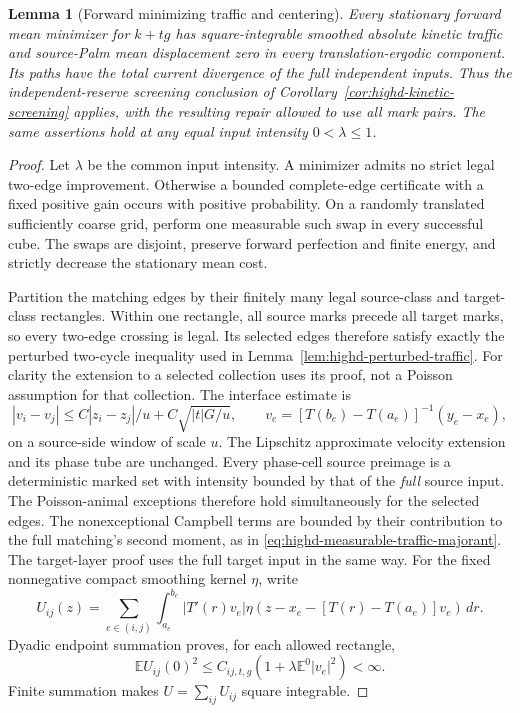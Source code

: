 \documentclass[11pt,reqno]{amsart}
\newtheorem{lemma}[theorem]{Lemma}
\theoremstyle{definition}
\theoremstyle{remark}
\numberwithin{equation}{section}
\newcommand{\E}{\mathbb E}
\begin{document}
\begin{lemma}[Forward minimizing traffic and centering]
\label{forward-full-traffic-centering}
Every stationary forward mean minimizer for \(k+t g\) has
square-integrable smoothed absolute kinetic traffic and source-Palm mean
displacement zero in every translation-ergodic component. Its paths have
the total current divergence of the full independent inputs. Thus the
independent-reserve screening conclusion of
Corollary~\ref{cor:highd-kinetic-screening} applies, with the resulting
repair allowed to use all mark pairs. The same assertions hold at any
equal input intensity \(0<\lambda\le1\).
\end{lemma}
\begin{proof}
Let \(\lambda\) be the common input intensity. A minimizer admits no
strict legal two-edge improvement. Otherwise a
bounded complete-edge certificate with a fixed positive gain occurs with
positive probability. On a randomly translated sufficiently coarse grid,
perform one measurable such swap in every successful cube. The swaps are
disjoint, preserve forward perfection and finite energy, and strictly
decrease the stationary mean cost.

Partition the matching edges by their finitely many legal source-class and
target-class rectangles. Within one rectangle, all source marks precede
all target marks, so every two-edge crossing is legal. Its selected edges
therefore satisfy exactly the perturbed two-cycle inequality used in
Lemma~\ref{lem:highd-perturbed-traffic}. For clarity the extension to a
selected collection uses its proof, not a Poisson assumption for that
collection. The interface estimate is
\[
 |v_i-v_j|\le C|z_i-z_j|/u+C\sqrt{|t|G/u},
 \qquad v_e=[T(b_e)-T(a_e)]^{-1}(y_e-x_e),
\]
on a source-side window of scale \(u\). The Lipschitz approximate
velocity extension and its phase tube are unchanged. Every phase-cell
source preimage is a deterministic marked set with intensity bounded by
that of the \emph{full} source input. The Poisson-animal exceptions
therefore hold simultaneously for the selected edges. The nonexceptional
Campbell terms are bounded by their contribution to the full matching's
second moment, as in \eqref{eq:highd-measurable-traffic-majorant}.
The target-layer proof uses the full target input in the same way.
For the fixed nonnegative compact smoothing kernel \(\eta\), write
\[
 U_{ij}(z)=\sum_{e\in(i,j)}\int_{a_e}^{b_e}
 |T'(r)v_e|\eta(z-x_e-[T(r)-T(a_e)]v_e)\,dr.
\]
Dyadic endpoint summation proves, for each allowed rectangle,
\[
 \E U_{ij}(0)^2\le C_{ij,t,g}(1+\lambda\E^0|v_e|^2)<\infty.
\]
Finite summation makes \(U=\sum_{ij}U_{ij}\) square integrable.


\end{proof}
\end{document}
